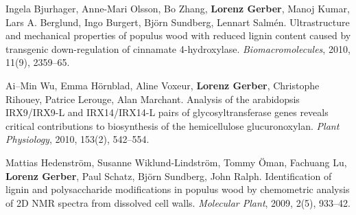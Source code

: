 \documentclass[10pt]{article}
\begin{document}
\begin{bibenum}
                                                                                           \item Ingela Bjurhager, Anne-Mari Olsson, Bo Zhang,
                                                                                             \textbf{Lorenz Gerber}, Manoj Kumar, Lars A. Berglund,
                                                                                             Ingo Burgert, Bj\"{o}rn Sundberg, Lennart Salm\'{e}n.
                                                                                             Ultrastructure and mechanical properties of populus wood with
                                                                                             reduced lignin content caused by transgenic down-regulation of
                                                                                             cinnamate 4-hydroxylase. \emph{Biomacromolecules}, 2010, 11(9), 2359--65.\\

                                                                                           \item Ai--Min Wu, Emma H\"{o}rnblad, Aline Voxeur, \textbf{Lorenz Gerber},
                                                                                             Christophe Rihouey, Patrice Lerouge, Alan Marchant. Analysis
                                                                                             of the arabidopsis IRX9/IRX9-L and IRX14/IRX14-L pairs of
                                                                                             glycosyltransferase genes reveals critical contributions
                                                                                             to biosynthesis of the hemicellulose glucuronoxylan. \emph{Plant
                                                                                               Physiology}, 2010, 153(2), 542--554.\\

                                                                                           \item Mattias Hedenstr\"{o}m, Susanne Wiklund-Lindstr\"{o}m,
                                                                                             Tommy \"{O}man, Fachuang Lu, \textbf{Lorenz Gerber},
                                                                                             Paul Schatz, Bj\"{o}rn Sundberg, John Ralph.
                                                                                             Identification of lignin and polysaccharide modifications
                                                                                             in populus wood by chemometric analysis of 2D NMR spectra
                                                                                             from dissolved cell walls. \emph{Molecular Plant}, 2009, 2(5), 933--42.\\


                                                                                           \end{bibenum}
\end{document}

